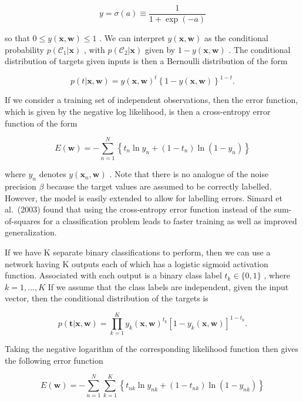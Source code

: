 \documentclass[
  10
]{article}
\begin{document}
\[
y = \sigma (a) \equiv \frac {1}{1 + \exp (- a)}\tag{5.19}
\]

so that \(0 \leqslant y ( \mathbf { x } , \mathbf { w } ) \leqslant 1\)
. We can interpret \(y ( \mathbf { x } , \mathbf { w } )\) as the
conditional probability \(p ( \mathcal { C } _ { 1 } | \mathbf { x } )\)
, with \(p ( \mathcal { C } _ { 2 } | \mathbf { x } )\) given by
\(1 - y ( \mathbf x , \mathbf w )\) . The conditional distribution of
targets given inputs is then a Bernoulli distribution of the form

\[
p (t | \mathbf {x}, \mathbf {w}) = y (\mathbf {x}, \mathbf {w}) ^ {t} \left\{1 - y (\mathbf {x}, \mathbf {w}) \right\} ^ {1 - t}.\tag{5.20}
\]

If we consider a training set of independent observations, then the
error function, which is given by the negative log likelihood, is then a
cross-entropy error function of the form

\[
E (\mathbf {w}) = - \sum_ {n = 1} ^ {N} \left\{t _ {n} \ln y _ {n} + (1 - t _ {n}) \ln (1 - y _ {n}) \right\}\tag{5.21}
\]

where \(y _ { n }\) denotes
\(y ( \mathbf { x } _ { n } , \mathbf { w } )\) . Note that there is no
analogue of the noise precision \(\beta\) because the target values are
assumed to be correctly labelled. However, the model is easily extended
to allow for labelling errors. Simard et al.~(2003) found that using the
cross-entropy error function instead of the sum-of-squares for a
classification problem leads to faster training as well as improved
generalization.

If we have K separate binary classifications to perform, then we can use
a network having K outputs each of which has a logistic sigmoid
activation function. Associated with each output is a binary class label
\(t _ { k } \in \{ 0 , 1 \}\) , where \(k = 1 , \ldots , K\) If we
assume that the class labels are independent, given the input vector,
then the conditional distribution of the targets is

\[
p (\mathbf {t} | \mathbf {x}, \mathbf {w}) = \prod_ {k = 1} ^ {K} y _ {k} (\mathbf {x}, \mathbf {w}) ^ {t _ {k}} \left[ 1 - y _ {k} (\mathbf {x}, \mathbf {w}) \right] ^ {1 - t _ {k}}.\tag{5.22}
\]

Taking the negative logarithm of the corresponding likelihood function
then gives the following error function

\[
E (\mathbf {w}) = - \sum_ {n = 1} ^ {N} \sum_ {k = 1} ^ {K} \left\{t _ {n k} \ln y _ {n k} + (1 - t _ {n k}) \ln (1 - y _ {n k}) \right\}\tag{5.23}
\]
\end{document}
